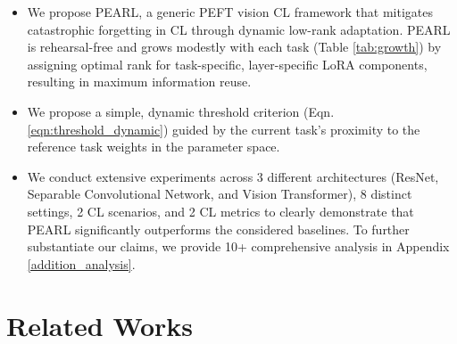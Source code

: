 \documentclass[10pt]{article} %
\begin{document}
\begin{itemize}
    \item We propose PEARL, a generic PEFT vision CL framework that mitigates catastrophic forgetting in CL through dynamic low-rank adaptation. PEARL is rehearsal-free and grows modestly with each task (Table \ref{tab:growth}) by assigning optimal rank for task-specific, layer-specific LoRA components, resulting in maximum information reuse. 
    \item We propose a simple, dynamic threshold criterion (Eqn. \ref{eqn:threshold_dynamic}) guided by the current task's proximity to the reference task weights in the parameter space. 

    \item We conduct extensive experiments across 3 different architectures (ResNet, Separable Convolutional Network, and Vision Transformer), 8 distinct settings, 2 CL scenarios, and 2 CL metrics  to clearly demonstrate that PEARL significantly outperforms the considered baselines. To further substantiate our claims, we provide 10+ comprehensive analysis in Appendix \ref{addition_analysis}.
    
\end{itemize}
 




\section{Related Works}
\end{document}
